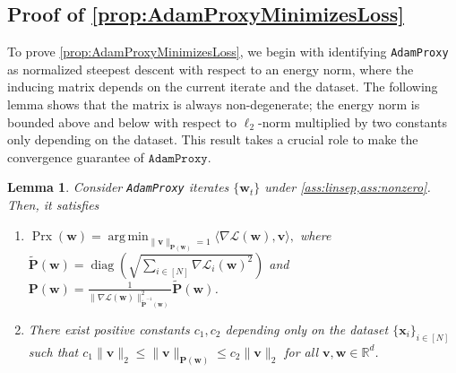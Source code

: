 \documentclass{article} %
\theoremstyle{plain}
\newtheorem{lemma}[theorem]{Lemma}
\theoremstyle{definition}
\theoremstyle{remark}
\newcommand{\Ls}{\mathcal{L}}
\newcommand{\R}{\mathbb{R}}
\DeclareMathOperator*{\argmin}{arg\,min}
\def\bx{{\mathbf x}}
\def\bP{{\mathbf P}}
\def\bw{{\mathbf w}}
\def\bv{{\mathbf v}}
\DeclareMathOperator{\diag}{diag}
\DeclareMathOperator{\proxy}{Prx}
\begin{document}
\subsection[Proof of Proposition \ref{prop:AdamProxyMinimizesLoss}]{Proof of \cref{prop:AdamProxyMinimizesLoss}}
To prove \cref{prop:AdamProxyMinimizesLoss}, we begin with identifying \texttt{AdamProxy} as normalized steepest descent with respect to an energy norm, where the inducing matrix depends on the current iterate and the dataset. The following lemma shows that the matrix is always non-degenerate; the energy norm is bounded above and below with respect to $\ell_2$-norm multiplied by two constants only depending on the dataset. This result takes a crucial role to make the convergence guarantee of $\texttt{AdamProxy}$.

\begin{lemma}\label{lemma:AdamProxy_property}
Consider \textnormal{\texttt{AdamProxy}} iterates $\{\bw_t\}$ under \cref{ass:linsep,ass:nonzero}. Then, it satisfies
    \begin{enumerate}[label=(\alph*)]
        \item $\displaystyle \proxy(\bw)= \argmin_{\|\bv\|_{\bP(\bw)}=1}\langle \nabla \Ls(\bw), \bv \rangle,$ where $\tilde{\bP}(\bw)=\diag\left(\sqrt{\sum_{i\in[N]}\nabla\Ls_i(\bw)^2}\right)$ and $\bP(\bw)=\frac{1}{\|\nabla\Ls(\bw)\|_{\tilde{\bP}^{-1}(\bw)}^2}\tilde{\bP}(\bw)$.
        \item There exist positive constants $c_1, c_2$ depending only on the dataset $\{\bx_i\}_{i \in [N]}$ such that $c_1\|\bv\|_2 \leq \|\bv\|_{\bP(\bw)} \leq c_2 \|\bv\|_2$ for all $\bv, \bw \in \R^d$.
    \end{enumerate}
\end{lemma}
\end{document}

